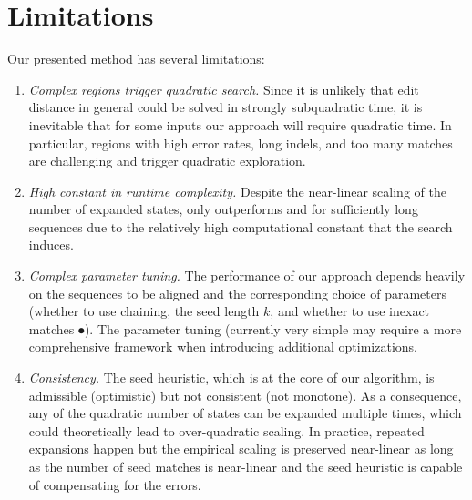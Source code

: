 \section*{Limitations}

Our presented method has several limitations:
\begin{enumerate}
  \item \emph{Complex regions trigger quadratic search.} Since it is unlikely
        that edit distance in general could be solved in strongly subquadratic
        time, it is inevitable that for some inputs our approach will require
        quadratic time. In particular, regions with high error rates, long
        indels, and too many matches are challenging and trigger quadratic
        exploration.
  \item \emph{High constant in runtime complexity.} Despite the near-linear
        scaling of the number of expanded states, \astarpa only outperforms
        \edlib and \wfa for sufficiently long sequences due to the relatively
        high computational constant that the \A search induces.
  \item \emph{Complex parameter tuning.} The performance of our approach depends
        heavily on the sequences to be aligned and the corresponding choice of
        parameters (whether to use chaining, the seed length $k$, and whether to
        use inexact matches $\spot$). The parameter tuning (currently very
        simple may require a more comprehensive framework when introducing
        additional optimizations.
  \item \emph{Consistency.} The seed heuristic, which is at the core of our \A
        algorithm, is admissible (optimistic) but not consistent (not monotone).
        As a consequence, any of the quadratic number of states can be expanded
        multiple times, which could theoretically lead to over-quadratic
        scaling. In practice, repeated expansions happen but the empirical
        scaling is preserved near-linear as long as the number of seed matches
        is near-linear and the seed heuristic is capable of compensating for the
        errors.
\end{enumerate}

